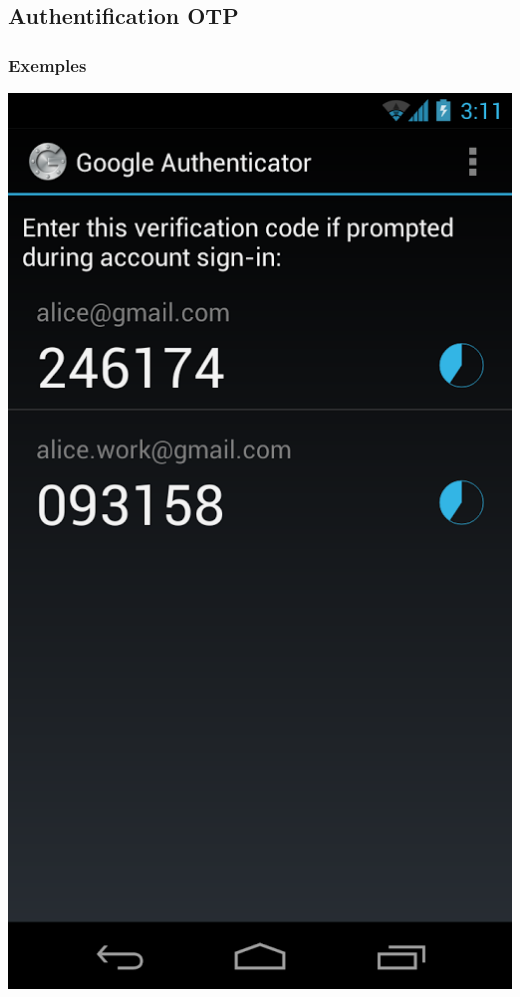 \documentclass[xcolor=table]{beamer}
\begin{document}
\subsection{Authentification OTP}
\begin{frame}
\frametitle{Exemples}
\begin{center}
\includegraphics[scale=0.2]{../graphics/googleauth.png}
\hspace{1em}

\end{center}
\end{frame}
\end{document}
